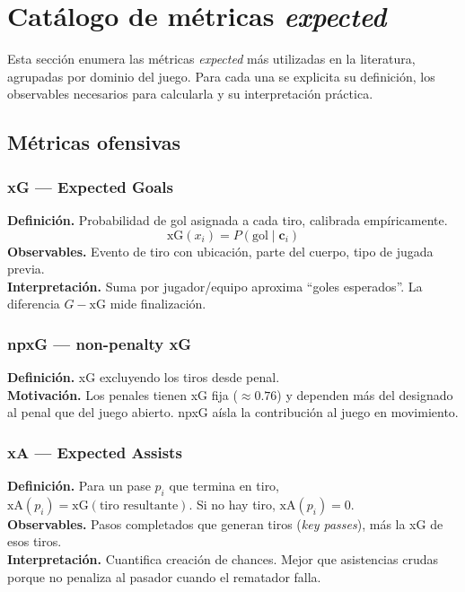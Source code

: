 \section{Catálogo de métricas \emph{expected}}
\label{sec:catalogo}

Esta sección enumera las métricas \emph{expected} más utilizadas en la literatura, agrupadas por dominio del juego. Para cada una se explicita su definición, los observables necesarios para calcularla y su interpretación práctica.

\subsection{Métricas ofensivas}

\subsubsection{xG --- Expected Goals}

\textbf{Definición.} Probabilidad de gol asignada a cada tiro, calibrada empíricamente.
\[
  \mathrm{xG}(x_i) = P(\text{gol} \mid \mathbf{c}_i)
\]
\textbf{Observables.} Evento de tiro con ubicación, parte del cuerpo, tipo de jugada previa.\\
\textbf{Interpretación.} Suma por jugador/equipo aproxima ``goles esperados''. La diferencia $G - \mathrm{xG}$ mide finalización.

\subsubsection{npxG --- non-penalty xG}

\textbf{Definición.} xG excluyendo los tiros desde penal.\\
\textbf{Motivación.} Los penales tienen xG fija ($\approx 0.76$) y dependen más del designado al penal que del juego abierto. npxG aísla la contribución al juego en movimiento.

\subsubsection{xA --- Expected Assists}

\textbf{Definición.} Para un pase $p_i$ que termina en tiro, $\mathrm{xA}(p_i) = \mathrm{xG}(\text{tiro resultante})$. Si no hay tiro, $\mathrm{xA}(p_i) = 0$.\\
\textbf{Observables.} Pasos completados que generan tiros (\emph{key passes}), más la xG de esos tiros.\\
\textbf{Interpretación.} Cuantifica creación de chances. Mejor que asistencias crudas porque no penaliza al pasador cuando el rematador falla.

